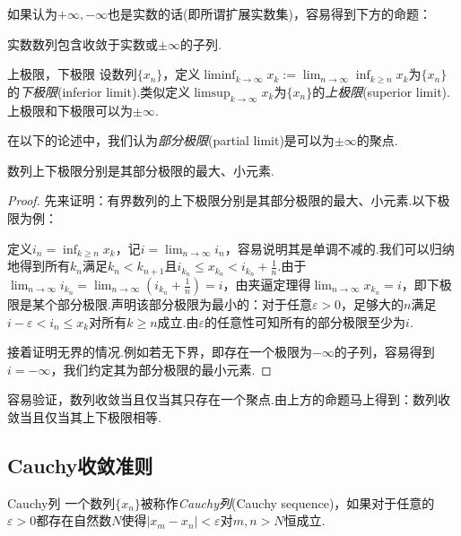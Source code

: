 如果认为$+\infty ,-\infty$也是实数的话(即所谓扩展实数集)，容易得到下方的命题：

\begin{proposition}{}
	实数数列包含收敛于实数或$\pm \infty$的子列.
\end{proposition}

\begin{definition}{上极限，下极限}
	设数列$\{ x_n \}$，定义$\liminf_{k\to \infty} x_k:=\lim_{n\to \infty} \inf_{k \geq n} x_k$为$\{ x_n \}$的\textit{下极限}(inferior limit).类似定义$\limsup_{k\to \infty} x_k$为$\{ x_n \}$的\textit{上极限}(superior limit).上极限和下极限可以为$\pm \infty$.
\end{definition}

在以下的论述中，我们认为\textit{部分极限}(partial limit)是可以为$\pm \infty$的聚点.

\begin{proposition}{}
	数列上下极限分别是其部分极限的最大、小元素.
\end{proposition}
\begin{proof}
	先来证明：有界数列的上下极限分别是其部分极限的最大、小元素.以下极限为例：
	
	定义$i_n=\inf_{k\geq n}x_k$，记$i=\lim_{n\to \infty} i_{n}$，容易说明其是单调不减的.我们可以归纳地得到所有$k_n$满足$k_n<k_{n+1}$且$i_{k_n} \leq x_{k_n} < i_{k_n}+\frac{1}{n}$.由于$\lim_{n\to \infty} i_{k_n} = \lim_{n\to \infty} (i_{k_n}+\frac{1}{n} ) = i$，由夹逼定理得$\lim_{n\to \infty} x_{k_n}=i$，即下极限是某个部分极限.声明该部分极限为最小的：对于任意$\varepsilon >0$，足够大的$n$满足$i-\varepsilon < i_n \leq x_k$对所有$k \geq n$成立.由$\varepsilon$的任意性可知所有的部分极限至少为$i$.
	
	接着证明无界的情况.例如若无下界，即存在一个极限为$-\infty$的子列，容易得到$i=-\infty$，我们约定其为部分极限的最小元素.
\end{proof}

容易验证，数列收敛当且仅当其只存在一个聚点.由上方的命题马上得到：数列收敛当且仅当其上下极限相等.

\subsection{Cauchy收敛准则}

\begin{definition}{Cauchy列}
	一个数列$\{ x_n \}$被称作\textit{Cauchy列}(Cauchy sequence)，如果对于任意的$\varepsilon >0$都存在自然数$N$使得$|x_m-x_n|<\varepsilon$对$m,n>N$恒成立.
\end{definition}

